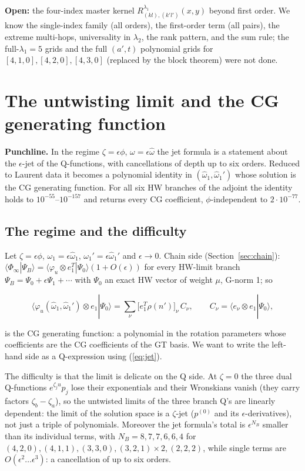 \documentclass[11pt]{article}
\begin{document}
\textbf{Open:} the four-index master kernel $R^{\lambda_1}_{(kl),(k'l')}(x,y)$ beyond first order.
We know the single-index family (all orders), the first-order term (all pairs), the extreme multi-hops, universality in $\lambda_2$, the rank pattern, and the sum rule; the full-$\lambda_1=5$ grids and the full $(a',t)$ polynomial grids for $[4,1,0],[4,2,0],[4,3,0]$ (replaced by the block theorem) were not done.

\section{The untwisting limit and the CG generating function}\label{sec:untwist}

\textbf{Punchline.} In the regime $\zeta=\epsilon\phi$, $\omega=\epsilon\hat\omega$ the jet formula is a statement about the $\epsilon$-jet of the Q-functions, with cancellations of depth up to six orders.
Reduced to Laurent data it becomes a polynomial identity in $(\hat\omega_1,\hat\omega_1')$ whose solution is the CG generating function.
For all six HW branches of the adjoint the identity holds to $10^{-55}$--$10^{-157}$ and returns every CG coefficient, $\phi$-independent to $2\cdot10^{-77}$.

\subsection{The regime and the difficulty}\label{sec:regime}

Let $\zeta=\epsilon\phi$, $\omega_1=\epsilon\hat\omega_1$, $\omega_1'=\epsilon\hat\omega_1'$ and $\epsilon\to0$. Chain side (Section~\ref{sec:chain}): $\langle\Phi_\infty|\Psi_B\rangle=\langle\varphi_u\otimes e_1^T|\Psi_0\rangle(1+O(\epsilon))$ for every HW-limit branch $\Psi_B=\Psi_0+\epsilon\Psi_1+\cdots$ with $\Psi_0$ an exact HW vector of weight $\mu$, G-norm 1; so

\begin{equation}
\langle\varphi_u(\hat\omega_1,\hat\omega_1')\otimes e_1|\Psi_0\rangle=\sum_\nu\bigl[e_1^T\rho(n')\bigr]_\nu\,C_\nu,\qquad C_\nu=\langle e_\nu\otimes e_1|\Psi_0\rangle,\label{eq:CGgf}
\end{equation}

is the CG generating function: a polynomial in the rotation parameters whose coefficients are the CG coefficients of the GT basis.
We want to write the left-hand side as a Q-expression using (\ref{eq:jet}).

The difficulty is that the limit is delicate on the Q side.
At $\zeta=0$ the three dual Q-functions $e^{\zeta_ju}p_j$ lose their exponentials and their Wronskians vanish (they carry factors $\zeta_b-\zeta_a$), so the untwisted limits of the three branch Q's are linearly dependent: the limit of the solution space is a $\zeta$-jet ($p^{(0)}$ and its $\epsilon$-derivatives), not just a triple of polynomials.
Moreover the jet formula's total is $\epsilon^{N_B}$ smaller than its individual terms, with $N_B=8,7,7,6,6,4$ for $(4,2,0),(4,1,1),(3,3,0),(3,2,1)\times2,(2,2,2)$, while single terms are $O(\epsilon^2\ldots\epsilon^3)$: a cancellation of up to six orders.
\end{document}
